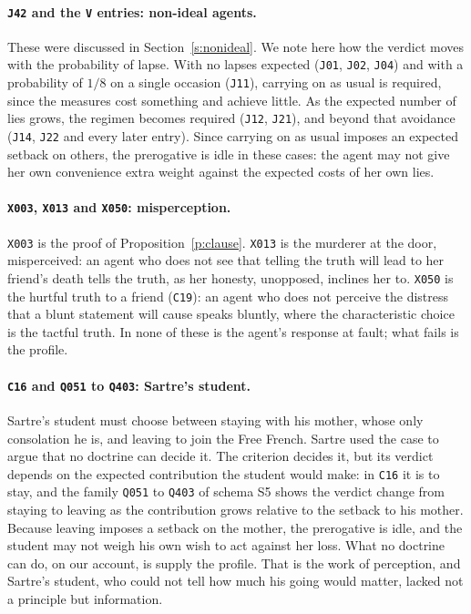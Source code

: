 \documentclass{situationist-preprint}
\begin{document}
\paragraph{\texttt{J42} and the \texttt{V} entries: non-ideal agents.} These were discussed in Section~\ref{s:nonideal}. We note here how the verdict moves with the probability of lapse. With no lapses expected (\texttt{J01}, \texttt{J02}, \texttt{J04}) and with a probability of $1/8$ on a single occasion (\texttt{J11}), carrying on as usual is required, since the measures cost something and achieve little. As the expected number of lies grows, the regimen becomes required (\texttt{J12}, \texttt{J21}), and beyond that avoidance (\texttt{J14}, \texttt{J22} and every later entry). Since carrying on as usual imposes an expected setback on others, the prerogative is idle in these cases: the agent may not give her own convenience extra weight against the expected costs of her own lies.

\paragraph{\texttt{X003}, \texttt{X013} and \texttt{X050}: misperception.} \texttt{X003} is the proof of Proposition~\ref{p:clause}. \texttt{X013} is the murderer at the door, misperceived: an agent who does not see that telling the truth will lead to her friend's death tells the truth, as her honesty, unopposed, inclines her to. \texttt{X050} is the hurtful truth to a friend (\texttt{C19}): an agent who does not perceive the distress that a blunt statement will cause speaks bluntly, where the characteristic choice is the tactful truth. In none of these is the agent's response at fault; what fails is the profile.

\paragraph{\texttt{C16} and \texttt{Q051} to \texttt{Q403}: Sartre's student.} Sartre's student \citep{Sartre1946} must choose between staying with his mother, whose only consolation he is, and leaving to join the Free French. Sartre used the case to argue that no doctrine can decide it. The criterion decides it, but its verdict depends on the expected contribution the student would make: in \texttt{C16} it is to stay, and the family \texttt{Q051} to \texttt{Q403} of schema S5 shows the verdict change from staying to leaving as the contribution grows relative to the setback to his mother. Because leaving imposes a setback on the mother, the prerogative is idle, and the student may not weigh his own wish to act against her loss. What no doctrine can do, on our account, is supply the profile. That is the work of perception, and Sartre's student, who could not tell how much his going would matter, lacked not a principle but information.
\end{document}
